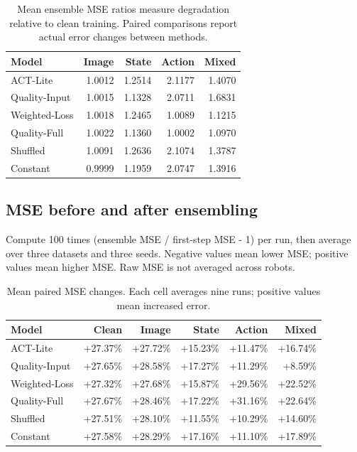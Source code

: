 \documentclass[11pt,a4paper]{article}
\renewcommand{\arraystretch}{1.22}
\begin{document}
\begin{table}[H]\centering\small\begin{tabular}{lrrrr}\toprule
Model & Image & State & Action & Mixed\\\midrule
ACT-Lite & 1.0012 & 1.2514 & 2.1177 & 1.4070\\
Quality-Input & 1.0015 & 1.1328 & 2.0711 & 1.6831\\
Weighted-Loss & 1.0018 & 1.2465 & 1.0089 & 1.1215\\
Quality-Full & 1.0022 & 1.1360 & 1.0002 & 1.0970\\
Shuffled & 1.0091 & 1.2636 & 2.1074 & 1.3787\\
Constant & 0.9999 & 1.1959 & 2.0747 & 1.3916\\
\bottomrule\end{tabular}\caption{Mean ensemble MSE ratios measure degradation relative to clean training. Paired comparisons report actual error changes between methods.}\end{table}
\clearpage\subsection{MSE before and after ensembling}
\begingroup\small\renewcommand{\arraystretch}{1.08}\setlength{\intextsep}{8pt}
Compute 100 times (ensemble MSE / first-step MSE - 1) per run, then average over three datasets and three seeds. Negative values mean lower MSE; positive values mean higher MSE. Raw MSE is not averaged across robots.
\begin{table}[H]\centering\small\begin{tabularx}{\linewidth}{Yrrrrr}\toprule
Model & Clean & Image & State & Action & Mixed\\\midrule
ACT-Lite & +27.37\% & +27.72\% & +15.23\% & +11.47\% & +16.74\%\\
Quality-Input & +27.65\% & +28.58\% & +17.27\% & +11.29\% & +8.59\%\\
Weighted-Loss & +27.32\% & +27.68\% & +15.87\% & +29.56\% & +22.52\%\\
Quality-Full & +27.67\% & +28.46\% & +17.22\% & +31.16\% & +22.64\%\\
Shuffled & +27.51\% & +28.10\% & +11.55\% & +10.29\% & +14.60\%\\
Constant & +27.58\% & +28.29\% & +17.16\% & +11.10\% & +17.89\%\\
\bottomrule\end{tabularx}\caption{Mean paired MSE changes. Each cell averages nine runs; positive values mean increased error.}\end{table}
\end{document}
